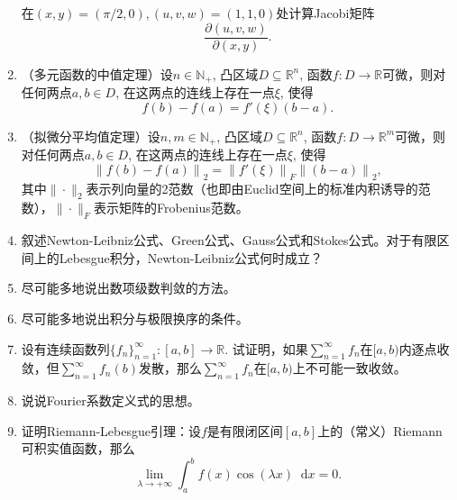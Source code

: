 \documentclass{ctexart}
\newcommand{\differential}{\mathop{}\!\mathrm{d}}
\newcommand{\realset}{\mathbb{R}}
\newcommand{\positiveinteger}{\mathbb{N_+}}
\begin{document}
\begin{enumerate}
\begin{equation*}
    \end{equation*}
    在$(x,y)=(\pi/2,0),(u,v,w)=(1,1,0)$处计算Jacobi矩阵
    \begin{equation*}
        \frac{\partial(u,v,w)}{\partial(x,y)}.
    \end{equation*}
    \item （多元函数的中值定理）设$n\in\positiveinteger$, 凸区域$D\subseteq \realset^n$, 函数$f\colon D\to\realset$可微，则对任何两点$a,b\in D$, 在这两点的连线上存在一点$\xi$, 使得\begin{equation*}
        f(b)-f(a)=f'(\xi)(b-a).
    \end{equation*}
    \item （拟微分平均值定理）设$n,m\in\positiveinteger$, 凸区域$D\subseteq \realset^n$, 函数$f\colon D\to\realset^m$可微，则对任何两点$a,b\in D$, 在这两点的连线上存在一点$\xi$, 使得\begin{equation*}
        \left\|f(b)-f(a)\right\|_2=\left\|f'(\xi)\right\|_F\left\|(b-a)\right\|_2,
    \end{equation*}
    其中$\|\cdot\|_2$表示列向量的2范数（也即由Euclid空间上的标准内积诱导的范数），$\|\cdot\|_F$表示矩阵的Frobenius范数。
    \item 叙述Newton-Leibniz公式、Green公式、Gauss公式和Stokes公式。对于有限区间上的Lebesgue积分，Newton-Leibniz公式何时成立？
    \item 尽可能多地说出数项级数判敛的方法。
    \item 尽可能多地说出积分与极限换序的条件。
    \item 设有连续函数列$\{f_n\}_{n=1}^\infty\colon [a,b]\to\realset$. 试证明，如果$\sum_{n=1}^{\infty}f_n$在$[a,b)$内逐点收敛，但$\sum_{n=1}^{\infty}f_n(b)$发散，那么$\sum_{n=1}^{\infty}f_n$在$[a,b)$上不可能一致收敛。
    \item 说说Fourier系数定义式的思想。
    \item 证明Riemann-Lebesgue引理：设$f$是有限闭区间$[a,b]$上的（常义）Riemann可积实值函数，那么\begin{equation*}
        \lim_{\lambda\to +\infty}\int_a^b f(x)\cos (\lambda x)\differential x=0.
    \end{equation*}
\end{enumerate}
\end{document}
